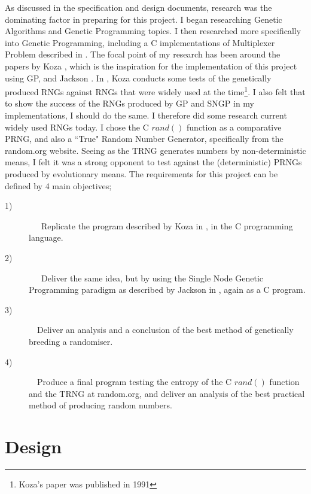 \documentclass[a4paper,10.5pt]{article}
\begin{document}
As discussed in the specification and design documents, research was the dominating factor in preparing for this project. I began researching Genetic Algorithms \cite[p.1 - 24]{mitchell} and Genetic Programming \cite[p.1 - 35]{introgp} \cite[p.73 - 191]{kozagpbook} topics. I then researched more specifically into Genetic Programming, including a C implementations of Multiplexer Problem described in \cite{kozamux}. The focal point of my research has been around the papers by Koza \cite{kozarng}, which is the inspiration for the implementation of this project using GP, and Jackson \cite{jacksonsngp2}. In \cite{kozarng}, Koza conducts some tests of the genetically produced RNGs against RNGs that were widely used at the time\footnote{Koza's paper was published in 1991}. I also felt that to show the success of the RNGs produced by GP and SNGP in my implementations, I should do the same. I therefore did some research current widely used RNGs today. I chose the C $rand()$ function as a comparative PRNG, and also a ``True" Random Number Generator, specifically from the random.org website. Seeing as the TRNG generates numbers by non-deterministic means, I felt it was a strong opponent to test against the (deterministic) PRNGs produced by evolutionary means.
The requirements for this project can be defined by 4 main objectives;
\begin{description}
  \item[1)]
  \ \ \ Replicate the program described by Koza in \cite{kozarng}, in the C programming language. 
  \item[2)]
 \ \ \ Deliver the same idea, but by using the Single Node Genetic Programming paradigm as described by Jackson in \cite{jacksonsngp2}, again as a C program.
  \item[3)]
  \ \  Deliver an analysis and a conclusion of the best method of genetically breeding a randomiser.
   \item[4)]
  \ \  Produce a final program testing the entropy of the C $rand()$ function and the TRNG at random.org, and deliver an analysis of the best practical method of producing random numbers.
\end{description}

\newpage
\section{Design}

\end{document}
